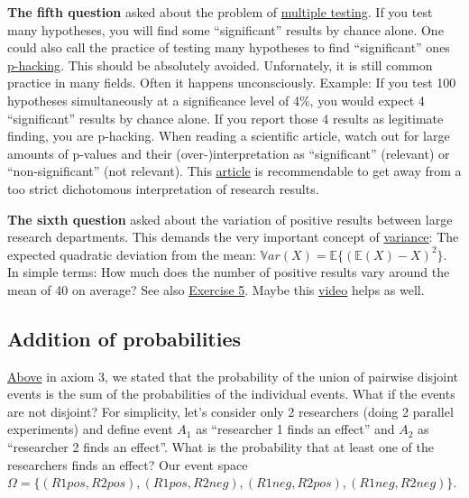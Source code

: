 \documentclass[
]{book}
\begin{document}
\textbf{The fifth question} asked about the problem of \href{https://en.wikipedia.org/wiki/Multiple_comparisons_problem}{multiple testing}.
If you test many hypotheses, you will find some ``significant'' results by chance alone.
One could also call the practice of testing many hypotheses to find ``significant'' ones \href{https://en.wikipedia.org/wiki/Data_dredging}{p-hacking}.
This should be absolutely avoided. Unfornately, it is still common practice in many fields. Often it happens unconsciously.
Example: If you test 100 hypotheses simultaneously at a significance level of 4\%, you would expect 4 ``significant'' results by chance alone.
If you report those 4 results as legitimate finding, you are p-hacking. When reading a scientific article, watch out for large amounts of p-values and
their (over-)interpretation as ``significant'' (relevant) or ``non-significant'' (not relevant).
This \href{https://www.tandfonline.com/doi/full/10.1080/00031305.2019.1583913}{article} is recommendable to get away from a too strict dichotomous interpretation of research results.

\textbf{The sixth question} asked about the variation of positive results between large research departments. This demands the very important concept of \href{https://en.wikipedia.org/wiki/Variance}{variance}:
The expected quadratic deviation from the mean: \(\mathbb{V}ar(X) = \mathbb{E} \{ (\mathbb{E}(X) - X)^2 \}\). In simple terms:
How much does the number of positive results vary around the mean of 40 on average?
See also \hyperref[exercise5]{Exercise 5}. Maybe this \href{https://www.youtube.com/watch?v=SzZ6GpcfoQY}{video} helps as well.

\subsection{Addition of probabilities}\label{addition_of_probabilities}

\hyperref[axioms_of_probability_theory]{Above} in axiom 3, we stated that the probability of the union of pairwise disjoint events is the sum of the
probabilities of the individual events.
What if the events are not disjoint? For simplicity, let's consider only 2 researchers (doing 2 parallel experiments) and define event \(A_1\) as ``researcher 1 finds an effect'' and
\(A_2\) as ``researcher 2 finds an effect''.
What is the probability that at least one of the researchers finds an effect?
Our event space
\(\Omega = \{ (R1pos, R2pos), (R1pos, R2neg), (R1neg, R2pos), (R1neg, R2neg) \}.\)
\end{document}
